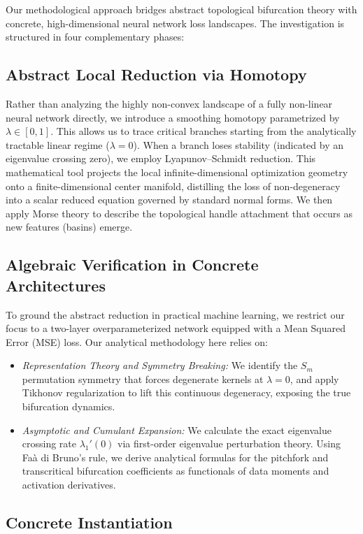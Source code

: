 \documentclass[11pt, reqno]{amsart}
\theoremstyle{plain}
\theoremstyle{definition}
\theoremstyle{remark}
\begin{document}
Our methodological approach bridges abstract topological bifurcation theory with concrete, high-dimensional neural network loss landscapes. The investigation is structured in four complementary phases:

\subsection{Abstract Local Reduction via Homotopy}
Rather than analyzing the highly non-convex landscape of a fully non-linear neural network directly, we introduce a smoothing homotopy parametrized by $\lambda \in [0,1]$. This allows us to trace critical branches starting from the analytically tractable linear regime ($\lambda=0$). When a branch loses stability (indicated by an eigenvalue crossing zero), we employ Lyapunov--Schmidt reduction. This mathematical tool projects the local infinite-dimensional optimization geometry onto a finite-dimensional center manifold, distilling the loss of non-degeneracy into a scalar reduced equation governed by standard normal forms. We then apply Morse theory to describe the topological handle attachment that occurs as new features (basins) emerge.

\subsection{Algebraic Verification in Concrete Architectures}
To ground the abstract reduction in practical machine learning, we restrict our focus to a two-layer overparameterized network equipped with a Mean Squared Error (MSE) loss. Our analytical methodology here relies on:
\begin{itemize}[leftmargin=*]
    \item \emph{Representation Theory and Symmetry Breaking:} We identify the $S_m$ permutation symmetry that forces degenerate kernels at $\lambda=0$, and apply Tikhonov regularization to lift this continuous degeneracy, exposing the true bifurcation dynamics.
    \item \emph{Asymptotic and Cumulant Expansion:} We calculate the exact eigenvalue crossing rate $\lambda_1'(0)$ via first-order eigenvalue perturbation theory. Using Fa\`a di Bruno's rule, we derive analytical formulas for the pitchfork and transcritical bifurcation coefficients as functionals of data moments and activation derivatives.
\end{itemize}

\subsection{Concrete Instantiation}
\end{document}
